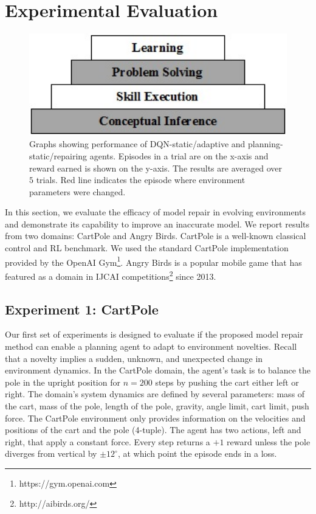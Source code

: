 \documentclass[letterpaper]{article} %
\begin{document}
\section{Experimental Evaluation}
\begin{figure}
\centering
\includegraphics[width=1\textwidth]{cascade.png}
\caption{Graphs showing performance of DQN-static/adaptive and planning-static/repairing agents. Episodes in a trial are on the x-axis and reward earned is shown on the y-axis. The results are averaged over $5$ trials. Red line indicates the episode where environment parameters were changed.}
\label{fig:combined_results}
\end{figure}
In this section, we evaluate the efficacy of model repair in evolving environments and demonstrate its capability to improve an inaccurate model. We report results from two domains: CartPole and Angry Birds. CartPole is a well-known classical control and RL benchmark. We used the standard CartPole implementation provided by the OpenAI Gym\footnote{https://gym.openai.com}. Angry Birds is a popular mobile game that has featured as a domain in IJCAI competitions\footnote{http://aibirds.org/} since 2013.

\subsection{Experiment 1: CartPole}
Our first set of experiments is designed to evaluate if the proposed model repair method can enable a planning agent to adapt to environment novelties. Recall that a novelty implies a sudden, unknown, and unexpected change in environment dynamics. In the CartPole domain, the agent's task is to balance the pole in the upright position for $n=200$ steps by pushing the cart either left or right. The domain's system dynamics are defined by several parameters: mass of the cart, mass of the pole, length of the pole, gravity, angle limit, cart limit, push force. The CartPole environment only provides information on the velocities and positions of the cart and the pole (4-tuple). The agent has two actions, left and right, that apply a constant force. Every step returns a $+1$ reward unless the pole diverges from vertical by $\pm 12^{\circ}$, at which point the episode ends in a loss.
\end{document}
